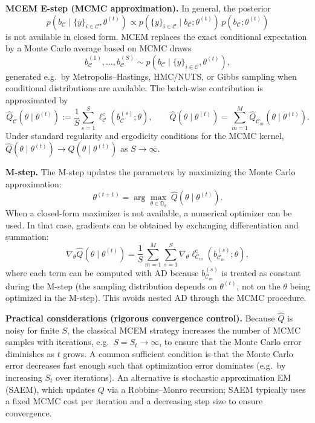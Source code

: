 \documentclass[12pt]{article}
\begin{document}
\textbf{MCEM E-step (MCMC approximation).}
In general, the posterior
\[
p\!\left(b_{\mathcal{C}} \mid \{y\}_{i\in\mathcal{C}},\theta^{(t)}\right)
\propto
p\!\left(\{y\}_{i\in\mathcal{C}} \mid b_{\mathcal{C}};\theta^{(t)}\right)\,
p\!\left(b_{\mathcal{C}};\theta^{(t)}\right)
\]
is not available in closed form. MCEM replaces the exact conditional expectation by a Monte Carlo average based on MCMC draws
\[
b_{\mathcal{C}}^{(1)},\dots,b_{\mathcal{C}}^{(S)}
\sim
p\!\left(b_{\mathcal{C}} \mid \{y\}_{i\in\mathcal{C}},\theta^{(t)}\right),
\]
generated e.g.\ by Metropolis--Hastings, HMC/NUTS, or Gibbs sampling when conditional distributions are available.
The batch-wise contribution is approximated by
\[
\widehat Q_{\mathcal{C}}(\theta\mid\theta^{(t)})
:=
\frac{1}{S}\sum_{s=1}^S
\ell_{\mathcal{C}}^{\mathrm{c}}(b_{\mathcal{C}}^{(s)};\theta),
\qquad
\widehat Q(\theta\mid\theta^{(t)})
=
\sum_{m=1}^M \widehat Q_{\mathcal{C}_m}(\theta\mid\theta^{(t)}).
\]
Under standard regularity and ergodicity conditions for the MCMC kernel, \(\widehat Q(\theta\mid\theta^{(t)})\to Q(\theta\mid\theta^{(t)})\) as \(S\to\infty\).

\textbf{M-step.}
The M-step updates the parameters by maximizing the Monte Carlo approximation:
\[
\theta^{(t+1)}
=
\arg\max_{\theta\in\mathbb{D}_\theta}\ \widehat Q(\theta\mid\theta^{(t)}).
\]
When a closed-form maximizer is not available, a numerical optimizer can be used. In that case, gradients can be obtained by exchanging differentiation and summation:
\[
\nabla_\theta \widehat Q(\theta\mid\theta^{(t)})
=
\frac{1}{S}\sum_{m=1}^M\sum_{s=1}^S
\nabla_\theta \ell_{\mathcal{C}_m}^{\mathrm{c}}(b_{\mathcal{C}_m}^{(s)};\theta),
\]
where each term can be computed with AD because \(b_{\mathcal{C}_m}^{(s)}\) is treated as constant during the M-step (the sampling distribution depends on \(\theta^{(t)}\), not on the \(\theta\) being optimized in the M-step). This avoids nested AD through the MCMC procedure.

\textbf{Practical considerations (rigorous convergence control).}
Because \(\widehat Q\) is noisy for finite \(S\), the classical MCEM strategy increases the number of MCMC samples with iterations, e.g.\ \(S=S_t\to\infty\), to ensure that the Monte Carlo error diminishes as \(t\) grows. A common sufficient condition is that the Monte Carlo error decreases fast enough such that optimization error dominates (e.g.\ by increasing \(S_t\) over iterations).
An alternative is stochastic approximation EM (SAEM), which updates \(Q\) via a Robbins--Monro recursion; SAEM typically uses a fixed MCMC cost per iteration and a decreasing step size to ensure convergence.
\end{document}
